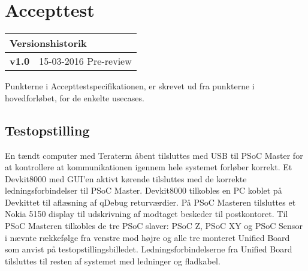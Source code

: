 \chapter{Accepttest}

\begin{table}[!htbp] \centering
\begin{tabular}{|p{2cm}|p{8cm}|}
	\hline
		\multicolumn{2}{|l|}{Versionshistorik} \\\hline
		\textbf{v1.0} &15-03-2016 Pre-review\\\hline
	\end{tabular}
\end{table}

Punkterne i Accepttestspecifikationen, er skrevet ud fra punkterne i hovedforløbet, for de enkelte usecases.

\section{Testopstilling}
En tændt computer med Teraterm åbent tilsluttes med USB til PSoC Master for at kontrollere at kommunikationen igennem hele systemet forløber korrekt. Et Devkit8000 med GUI’en aktivt kørende tilsluttes med de korrekte ledningsforbindelser til PSoC Master. Devkit8000 tilkobles en PC koblet på Devkittet til aflæsning af qDebug returværdier. På PSoC Masteren tilsluttes et Nokia 5150 display til udskrivning af modtaget beskeder til postkontoret. Til PSoC Masteren tilkobles de tre PSoC slaver: PSoC Z, PSoC XY og PSoC Sensor i nævnte rækkefølge fra venstre mod højre og alle tre monteret Unified Board som anvist på testopstillingsbilledet. Ledningsforbindelserne fra Unified Board tilsluttes til resten af systemet med ledninger og fladkabel.















%

%